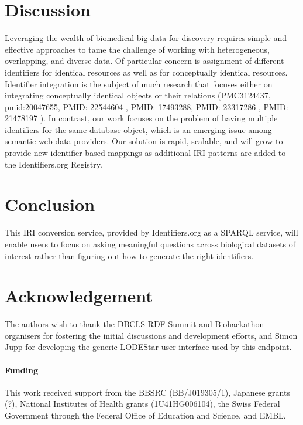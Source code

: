 \documentclass{bioinfo}
\begin{document}
\section{Discussion}
Leveraging the wealth of biomedical big data for discovery requires simple and effective approaches to tame the challenge of working with heterogeneous, overlapping, and diverse data. Of particular concern is assignment of different identifiers for identical resources as well as for conceptually identical resources. Identifier integration is the subject of much research that focuses either on integrating conceptually identical objects or their relations (PMC3124437, pmid:20047655, PMID: 22544604 , PMID: 17493288, PMID: 23317286 , PMID: 21478197 ). In contrast, our work focuses on the problem of having multiple identifiers for the same database object, which is an emerging issue among semantic web data providers. Our solution is rapid, scalable, and will grow to provide new identifier-based mappings as additional IRI patterns are added to the Identifiers.org Registry. 

\section{Conclusion}
This IRI conversion service, provided by Identifiers.org as a SPARQL service, will enable users to focus on asking meaningful questions across biological datasets of interest rather than figuring out how to generate the right identifiers. 

\section*{Acknowledgement}
The authors wish to thank the DBCLS RDF Summit and Biohackathon organisers for fostering the initial discussions and development efforts, and Simon Jupp for developing the generic LODEStar user interface used by this endpoint.

\paragraph{Funding\textcolon} 
This work received support from the BBSRC (BB/J019305/1), Japanese grants (?), National Institutes of Health grants (1U41HG006104), the Swiss Federal Government through the Federal Office of Education and Science, and EMBL.  


%
%
%
%
%
%
%
%
  
\end{document}
